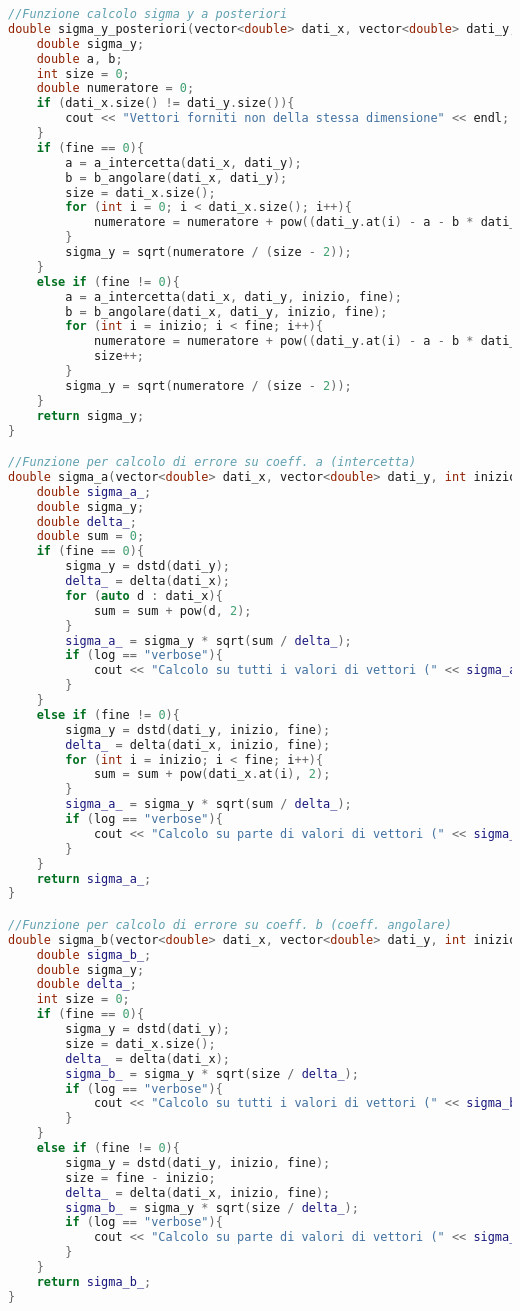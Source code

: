 \documentclass[a4paper,11pt,oneside]{article}
\begin{document}
\begin{lstlisting}[language=C++, label=lst:statistica.h, caption=statistica.h]
//Funzione calcolo sigma y a posteriori
double sigma_y_posteriori(vector<double> dati_x, vector<double> dati_y, int inizio = 0, int fine = 0, string log = ""){
    double sigma_y;
    double a, b;
    int size = 0;
    double numeratore = 0;
    if (dati_x.size() != dati_y.size()){
        cout << "Vettori forniti non della stessa dimensione" << endl;
    }
    if (fine == 0){
        a = a_intercetta(dati_x, dati_y);
        b = b_angolare(dati_x, dati_y);
        size = dati_x.size();
        for (int i = 0; i < dati_x.size(); i++){
            numeratore = numeratore + pow((dati_y.at(i) - a - b * dati_x.at(i)), 2);
        }
        sigma_y = sqrt(numeratore / (size - 2));
    }
    else if (fine != 0){
        a = a_intercetta(dati_x, dati_y, inizio, fine);
        b = b_angolare(dati_x, dati_y, inizio, fine);
        for (int i = inizio; i < fine; i++){
            numeratore = numeratore + pow((dati_y.at(i) - a - b * dati_x.at(i)), 2);
            size++;
        }
        sigma_y = sqrt(numeratore / (size - 2));
    }
    return sigma_y;
}

//Funzione per calcolo di errore su coeff. a (intercetta)
double sigma_a(vector<double> dati_x, vector<double> dati_y, int inizio = 0, int fine = 0, string log = ""){
    double sigma_a_;
    double sigma_y;
    double delta_;
    double sum = 0;
    if (fine == 0){
        sigma_y = dstd(dati_y);
        delta_ = delta(dati_x);
        for (auto d : dati_x){
            sum = sum + pow(d, 2);
        }
        sigma_a_ = sigma_y * sqrt(sum / delta_);
        if (log == "verbose"){
            cout << "Calcolo su tutti i valori di vettori (" << sigma_a_ << ")" << endl;
        }
    }
    else if (fine != 0){
        sigma_y = dstd(dati_y, inizio, fine);
        delta_ = delta(dati_x, inizio, fine);
        for (int i = inizio; i < fine; i++){
            sum = sum + pow(dati_x.at(i), 2);
        }
        sigma_a_ = sigma_y * sqrt(sum / delta_);
        if (log == "verbose"){
            cout << "Calcolo su parte di valori di vettori (" << sigma_a_ << ")" << endl;
        }
    }
    return sigma_a_;
}

//Funzione per calcolo di errore su coeff. b (coeff. angolare)
double sigma_b(vector<double> dati_x, vector<double> dati_y, int inizio = 0, int fine = 0, string log = ""){
    double sigma_b_;
    double sigma_y;
    double delta_;
    int size = 0;
    if (fine == 0){
        sigma_y = dstd(dati_y);
        size = dati_x.size();
        delta_ = delta(dati_x);
        sigma_b_ = sigma_y * sqrt(size / delta_);
        if (log == "verbose"){
            cout << "Calcolo su tutti i valori di vettori (" << sigma_b_ << ")" << endl;
        }
    }
    else if (fine != 0){
        sigma_y = dstd(dati_y, inizio, fine);
        size = fine - inizio;
        delta_ = delta(dati_x, inizio, fine);
        sigma_b_ = sigma_y * sqrt(size / delta_);
        if (log == "verbose"){
            cout << "Calcolo su parte di valori di vettori (" << sigma_b_ << ")" << endl;
        }
    }
    return sigma_b_;
}
\end{lstlisting}
\end{document}
